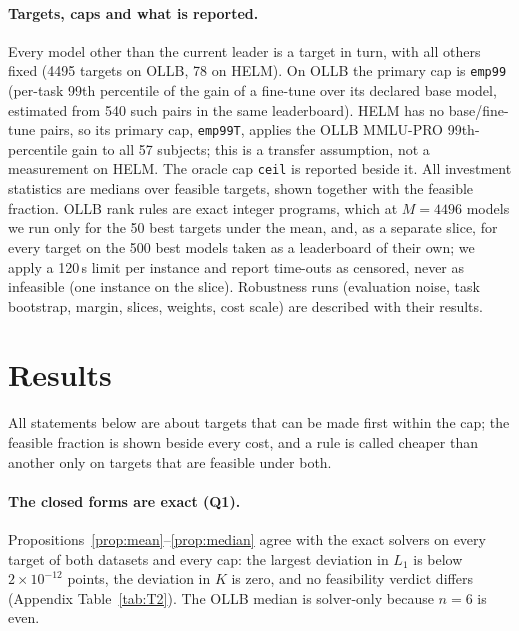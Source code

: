 \documentclass{article}
\begin{document}
\paragraph{Targets, caps and what is reported.}
Every model other than the current leader is a target in turn, with all others fixed (4495 targets on OLLB, 78 on HELM). On OLLB the primary cap is \texttt{emp99} (per-task 99th percentile of the gain of a fine-tune over its declared base model, estimated from 540 such pairs in the same leaderboard). HELM has no base/fine-tune pairs, so its primary cap, \texttt{emp99T}, applies the OLLB MMLU-PRO 99th-percentile gain to all 57 subjects; this is a transfer assumption, not a measurement on HELM. The oracle cap \texttt{ceil} is reported beside it. All investment statistics are medians over feasible targets, shown together with the feasible fraction. OLLB rank rules are exact integer programs, which at $M=4496$ models we run only for the 50 best targets under the mean, and, as a separate slice, for every target on the 500 best models taken as a leaderboard of their own; we apply a 120\,s limit per instance and report time-outs as censored, never as infeasible (one instance on the slice). Robustness runs (evaluation noise, task bootstrap, margin, slices, weights, cost scale) are described with their results.

\section{Results}
\label{sec:results}
All statements below are about targets that can be made first within the cap; the feasible fraction is shown beside every cost, and a rule is called cheaper than another only on targets that are feasible under both.

\paragraph{The closed forms are exact (Q1).}
Propositions~\ref{prop:mean}--\ref{prop:median} agree with the exact solvers on every target of both datasets and every cap: the largest deviation in $L_1$ is below $2\times10^{-12}$ points, the deviation in $K$ is zero, and no feasibility verdict differs (Appendix Table~\ref{tab:T2}). The OLLB median is solver-only because $n=6$ is even.
\end{document}
